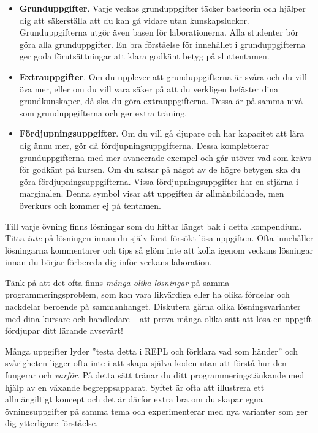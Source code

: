 \begin{itemize}
\item \textbf{Grunduppgifter}. Varje veckas grunduppgifter täcker basteorin och hjälper dig att säkerställa att du kan gå vidare utan kunskapsluckor. Grunduppgifterna utgör även basen för laborationerna. Alla studenter bör göra alla grunduppgifter. En bra förståelse för innehållet i grunduppgifterna ger goda förutsättningar att klara godkänt betyg på sluttentamen.

\item \textbf{Extrauppgifter}. Om du upplever att grunduppgifterna är svåra och du vill öva mer, eller om du vill vara säker på att du verkligen befäster dina grundkunskaper, då ska du göra extrauppgifterna. Dessa är på samma nivå som grunduppgifterna och ger extra träning.

\item \textbf{Fördjupningsuppgifter}. Om du vill gå djupare och har kapacitet att lära dig ännu mer, gör då fördjupningsuppgifterna. Dessa kompletterar grunduppgifterna med mer avancerade exempel och går utöver vad som krävs för godkänt på kursen. Om du satsar på något av de högre betygen ska du göra fördjupningsuppgifterna.
\Uberkurs Vissa fördjupningsuppgifter har en stjärna i marginalen. Denna symbol visar att uppgiften är allmänbildande, men överkurs och kommer ej på tentamen.

\end{itemize}


Till varje övning finns lösningar som du hittar längst bak i detta kompendium. Titta \emph{inte} på lösningen innan du själv först försökt lösa uppgiften. Ofta innehåller lösningarna kommentarer och tips så glöm inte att kolla igenom veckans lösningar innan du börjar förbereda dig inför veckans  laboration.

Tänk på att det ofta finns \emph{många olika lösningar} på samma programmeringsproblem, som kan vara likvärdiga eller ha olika fördelar och nackdelar beroende på sammanhanget. Diskutera gärna olika lösningsvarianter med dina kursare och handledare -- att prova många olika sätt att lösa en uppgift fördjupar ditt lärande avsevärt!

Många uppgifter lyder ''testa detta i REPL och förklara vad som händer'' och svårigheten ligger ofta inte i att skapa själva koden utan att förstå hur den fungerar och \emph{varför}. På detta sätt tränar du ditt programmeringstänkande med hjälp av en växande begreppsapparat. Syftet är ofta att illustrera ett allmängiltigt koncept och det är därför extra bra om du skapar egna övningsuppgifter på samma tema och experimenterar med nya varianter som ger dig ytterligare förståelse.

